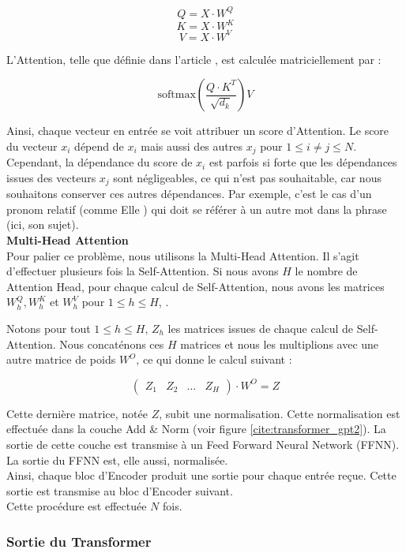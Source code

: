 \[ Q = X \cdot W^Q  \]
\[ K = X \cdot W^K  \]
\[ V = X \cdot W^V  \]

L'Attention, telle que définie dans l'article \cite{vaswani2017attention}, est calculée matriciellement par :

\[ \text{softmax}\left( \frac{Q \cdot K^T}{\sqrt{d_k}} \right) V \]

Ainsi, chaque vecteur en entrée se voit attribuer un \og score \fg{} d'Attention. Le score du vecteur $x_i$ dépend de $x_i$ mais 
aussi des autres $x_j$ pour $1 \leq i \neq j \leq N$. Cependant, la dépendance du score de $x_i$ est parfois si forte que les
dépendances issues des vecteurs $x_j$ sont négligeables, ce qui n'est pas souhaitable, car nous souhaitons
conserver ces autres dépendances. Par exemple, c'est le cas d'un pronom relatif (comme \og Elle \fg{}) qui doit se référer 
à un autre mot dans la phrase (ici, son sujet). \\

\textbf{Multi-Head Attention} \\


Pour palier ce problème, nous utilisons la Multi-Head Attention. Il s'agit d'effectuer plusieurs fois la Self-Attention. Si
nous avons $H$ le nombre de Attention Head, pour chaque calcul de Self-Attention, nous avons les matrices
$W_h^Q, W_h^K$ et $W_h^V$ pour $1 \leq h \leq H$, .

Notons pour tout $1 \leq h \leq H, \, Z_h$ les matrices issues de chaque calcul de Self-Attention. Nous concaténons
ces $H$ matrices et nous les multiplions avec une autre matrice de poids $W^O$, ce qui donne le calcul suivant :

\[  \begin{pmatrix}
    Z_1 & Z_2 & \ldots & Z_H
  \end{pmatrix}
  \cdot W^O = Z \]


Cette dernière matrice, notée $Z$, subit une normalisation. Cette normalisation est effectuée dans la 
couche \og Add \& Norm \fg{} (voir figure \ref{cite:transformer_gpt2}).
La sortie de cette couche est transmise à un Feed Forward Neural Network (FFNN).
La sortie du FFNN est, elle aussi, normalisée. \\

Ainsi, chaque bloc d'Encoder produit une sortie pour chaque entrée reçue. 
Cette sortie est transmise au bloc d'Encoder suivant. \\

Cette procédure est effectuée $N$ fois.


\subsubsection{Sortie du Transformer}


